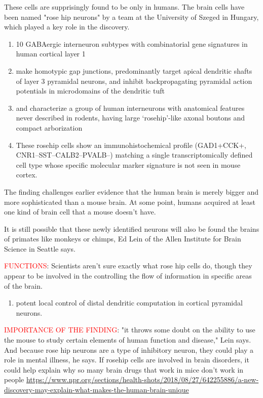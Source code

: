 These cells are supprisingly found to be only in humans.
The brain cells have been named "rose hip neurons" by a team at the University
of Szeged in Hungary, which played a key role in the discovery.
\begin{enumerate}
  \item  10 GABAergic interneuron subtypes with combinatorial gene signatures
  in human cortical layer 1 
  
  \item make homotypic gap junctions, predominantly target apical dendritic
  shafts of layer 3 pyramidal neurons,  and inhibit backpropagating pyramidal
  action potentials in microdomains of the dendritic tuft
  
  \item and characterize a group of human interneurons with
  anatomical features never described in rodents, having large ‘rosehip’-like
  axonal boutons and compact arborization
  
  \item These rosehip cells show an immunohistochemical profile (GAD1+CCK+,
  CNR1–SST–CALB2–PVALB–) matching a single transcriptomically defined cell type
  whose specific molecular marker signature is not seen in mouse cortex. 
  
  
\end{enumerate}

The finding challenges earlier evidence that the human brain is merely bigger
and more sophisticated than a mouse brain. At some point, humans acquired at
least one kind of brain cell that a mouse doesn't have.

It is still possible that these newly identified neurons will also be found the
brains of primates like monkeys or chimps, Ed Lein of the Allen Institute for
Brain Science in Seattle says.

\textcolor{red}{FUNCTIONS}: 
Scientists aren't sure exactly what rose hip cells do, though they appear to be
involved in the controlling the flow of information in specific areas of the
brain.
\begin{enumerate}
  \item   potent local control of distal dendritic computation in cortical
  pyramidal neurons.
\end{enumerate}

\textcolor{red}{IMPORTANCE OF THE FINDING}:  "it throws some doubt on the
ability to use the mouse to study certain elements of human function and
disease," Lein says. And because rose hip neurons are a type of inhibitory
neuron, they could play a role in mental illness, he says.  If rosehip cells are
involved in brain disorders, it could help explain why so many brain drugs that
work in mice don't work in people
\url{https://www.npr.org/sections/health-shots/2018/08/27/642255886/a-new-discovery-may-explain-what-makes-the-human-brain-unique}


